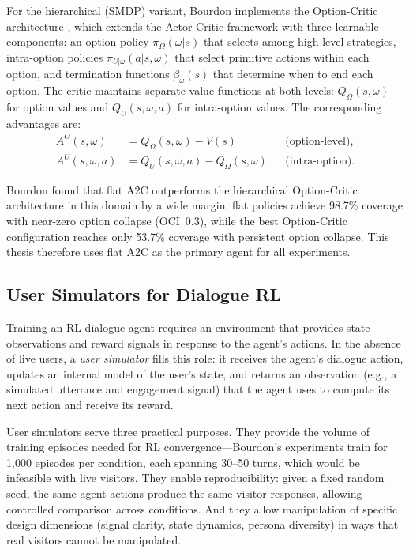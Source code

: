 \documentclass[a4paper, 11pt]{article}
\begin{document}
For the hierarchical (SMDP) variant, Bourdon implements the Option-Critic architecture \citep{bacon2017option}, which extends the Actor-Critic framework with three learnable components: an option policy $\pi_\Omega(\omega | s)$ that selects among high-level strategies, intra-option policies $\pi_{U|\omega}(a | s, \omega)$ that select primitive actions within each option, and termination functions $\beta_\omega(s)$ that determine when to end each option. The critic maintains separate value functions at both levels: $Q_\Omega(s, \omega)$ for option values and $Q_U(s, \omega, a)$ for intra-option values. The corresponding advantages are:
\begin{align}
  A^O(s, \omega) &= Q_\Omega(s, \omega) - V(s) && \text{(option-level)}, \label{eq:option_advantage} \\
  A^U(s, \omega, a) &= Q_U(s, \omega, a) - Q_\Omega(s, \omega) && \text{(intra-option)}. \label{eq:intraoption_advantage}
\end{align}

Bourdon found that flat A2C outperforms the hierarchical Option-Critic architecture in this domain by a wide margin: flat policies achieve 98.7\% coverage with near-zero option collapse (OCI~0.3), while the best Option-Critic configuration reaches only 53.7\% coverage with persistent option collapse. This thesis therefore uses flat A2C as the primary agent for all experiments.

\subsection{User Simulators for Dialogue RL}
\label{sec:bg_simulators}

Training an RL dialogue agent requires an environment that provides state observations and reward signals in response to the agent's actions. In the absence of live users, a \emph{user simulator} fills this role: it receives the agent's dialogue action, updates an internal model of the user's state, and returns an observation (e.g., a simulated utterance and engagement signal) that the agent uses to compute its next action and receive its reward.

User simulators serve three practical purposes. They provide the volume of training episodes needed for RL convergence---Bourdon's experiments train for 1{,}000 episodes per condition, each spanning 30--50 turns, which would be infeasible with live visitors. They enable reproducibility: given a fixed random seed, the same agent actions produce the same visitor responses, allowing controlled comparison across conditions. And they allow manipulation of specific design dimensions (signal clarity, state dynamics, persona diversity) in ways that real visitors cannot be manipulated.
\end{document}
